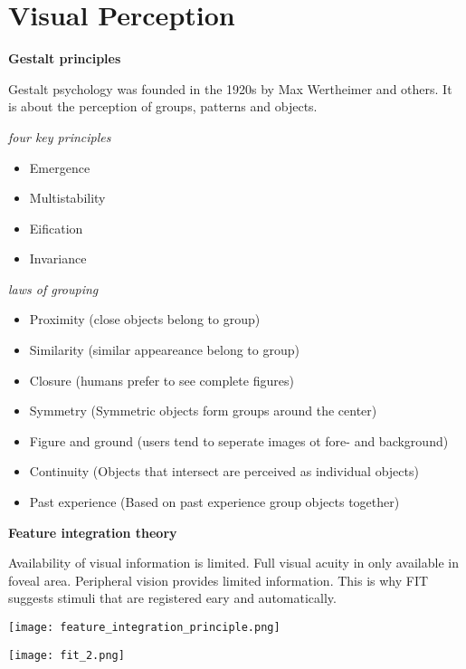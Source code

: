 \section{Visual Perception}

\textbf{Gestalt principles}


Gestalt psychology was founded in the 1920s by Max Wertheimer and others. It is about the perception of groups, patterns and objects. \medskip

\textit{four key principles}
\begin{multicols}{2}
    \begin{itemize}[itemsep=-5pt, topsep=0pt, leftmargin=*]
        \item Emergence
        \item Multistability
        \item Eification
        \item Invariance
    \end{itemize}
\end{multicols}

\textit{laws of grouping}
\begin{itemize}[itemsep=-5pt, topsep=0pt, leftmargin=*]
    \item Proximity (close objects belong to group)
    \item Similarity (similar appeareance belong to group)
    \item Closure (humans prefer to see complete figures)
    \item Symmetry (Symmetric objects form groups around the center)
    \item Figure and ground (users tend to seperate images ot fore- and background)
    \item Continuity (Objects that intersect are perceived as individual objects)
    \item Past experience (Based on past experience group objects together)
\end{itemize}
\medskip

\textbf{Feature integration theory} \smallskip

Availability of visual information is limited. Full visual acuity in only available in foveal area. Peripheral vision provides limited information. 
This is why FIT suggests stimuli that are registered eary and automatically. 

\begin{center}
	\texttt{[image: feature\_integration\_principle.png]}
\end{center}
\begin{center}
	\texttt{[image: fit\_2.png]}
\end{center}

